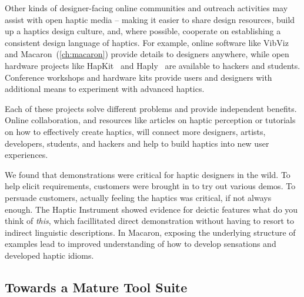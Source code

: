     Other kinds of designer-facing online communities and outreach activities may assist with open haptic media -- making it easier to share design resources,  build up a haptics design culture, and, where possible, cooperate on establishing a consistent design language of haptics. 
%
    For example, online software like VibViz~\cite{Seifi2015} and Macaron~(\autoref{ch:macaron}) provide details to designers anywhere, while open hardware projects like HapKit~\cite{Martinez2016} and Haply~\cite{Gallacher2016} are available to hackers and students.
    Conference workshops and hardware kits provide users and designers with additional means to experiment with advanced haptics.
    
    Each of these projects solve different problems and provide independent benefits.
    Online collaboration, and resources like articles on haptic perception or tutorials on how to effectively create haptics, will connect more designers, artists, developers, students, and hackers and help to build haptics into new user experiences.


We found that demonstrations were critical for haptic designers in the wild.
To help elicit requirements, customers were brought in to try out various demos.
To persuade customers, actually feeling the haptics was critical, if not always enough.
The Haptic Instrument showed evidence for deictic features what do you think of \emph{this}, which facillitated direct demonstration without having to resort to indirect linguistic descriptions.
In Macaron, exposing the underlying structure of examples lead to improved understanding of how to develop sensations and developed haptic idioms.


%
%
\subsection{Towards a Mature \haxd Tool Suite}
\label{sec:conclusion:maturetoolsuite}


